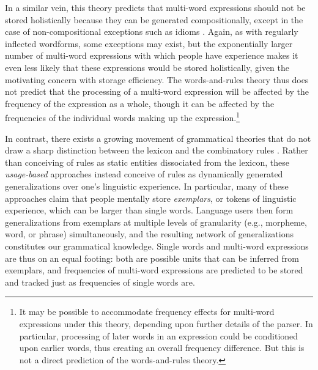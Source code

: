 \documentclass[authoryear]{elsarticle}
\begin{document}
In a similar vein, this theory predicts that multi-word expressions should not be stored holistically because they can be generated compositionally, except in the case of non-compositional exceptions such as idioms \citep{Swinney:1979wv}. Again, as with regularly inflected wordforms, some exceptions may exist, but the exponentially larger number of multi-word expressions with which people have experience makes it even less likely that these expressions would be stored holistically, given the motivating concern with storage efficiency. The words-and-rules theory thus does not predict that the processing of a multi-word expression will be affected by the frequency of the expression as a whole, though it can be affected by the frequencies of the individual words making up the expression.\footnote{It may be possible to accommodate frequency effects for multi-word expressions under this theory, depending upon further details of the parser. In particular, processing of later words in an expression could be conditioned upon earlier words, thus creating an overall frequency difference. But this is not a direct prediction of the words-and-rules theory.}


In contrast, there exists a growing movement of grammatical theories that do not draw a sharp distinction between the lexicon and the combinatory rules \citep[e.g.][]{Langacker:1987wg,Johnson:1997tf,Johnson:2006ii,Pierrehumbert:2000wh,Bybee:2003wl, Bybee:2006ul, Goldberg:2003bv,Gahl:is,Hay:2006dm,Baayen:2011eh,vandenBosch:2013ch}. Rather than conceiving of rules as static entities dissociated from the lexicon, these \emph{usage-based} approaches instead conceive of rules as dynamically generated generalizations over one's linguistic experience. In particular, many of these approaches \citep[notably][among others]{Bybee:2003wl,Hay:2006dm} claim that people mentally store \emph{exemplars}, or tokens of linguistic experience, which can be larger than single words. Language users then form generalizations from exemplars at multiple levels of granularity (e.g., morpheme, word, or phrase) simultaneously, and the resulting network of generalizations constitutes our grammatical knowledge. Single words and multi-word expressions are thus on an equal footing: both are possible units that can be inferred from exemplars, and frequencies of multi-word expressions are predicted to be stored and tracked just as frequencies of single words are.
\end{document}
